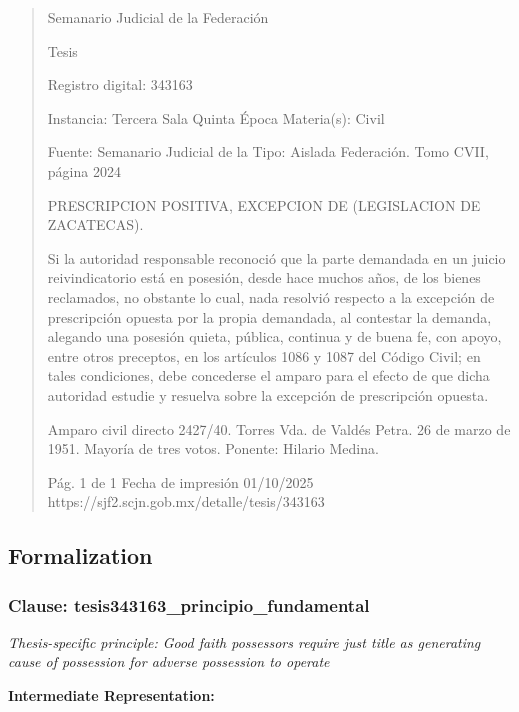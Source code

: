 \documentclass[11pt,a4paper]{article}
\begin{document}
\begin{quote}
                                                   Semanario Judicial de la Federación

                                                  Tesis

 Registro digital: 343163

 Instancia: Tercera Sala          Quinta Época                         Materia(s): Civil

                                  Fuente: Semanario Judicial de la     Tipo: Aislada
                                  Federación.
                                  Tomo CVII, página 2024


PRESCRIPCION POSITIVA, EXCEPCION DE (LEGISLACION DE ZACATECAS).


Si la autoridad responsable reconoció que la parte demandada en un juicio reivindicatorio está en
posesión, desde hace muchos años, de los bienes reclamados, no obstante lo cual, nada resolvió
respecto a la excepción de prescripción opuesta por la propia demandada, al contestar la demanda,
alegando una posesión quieta, pública, continua y de buena fe, con apoyo, entre otros preceptos, en
los artículos 1086 y 1087 del Código Civil; en tales condiciones, debe concederse el amparo para el
efecto de que dicha autoridad estudie y resuelva sobre la excepción de prescripción opuesta.


Amparo civil directo 2427/40. Torres Vda. de Valdés Petra. 26 de marzo de 1951. Mayoría de tres
votos. Ponente: Hilario Medina.




                                             Pág. 1 de 1             Fecha de impresión 01/10/2025
  https://sjf2.scjn.gob.mx/detalle/tesis/343163

\end{quote}

\subsection{Formalization}

\subsubsection{Clause: tesis343163\_principio\_fundamental}

\textit{Thesis-specific principle: Good faith possessors require just title as generating cause of possession for adverse possession to operate}

\textbf{Intermediate Representation:}
\end{document}
